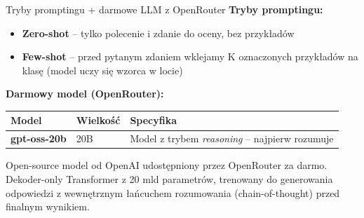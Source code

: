 \documentclass[10pt]{beamer}
\begin{document}
\begin{frame}{Tryby promptingu + darmowe LLM z OpenRouter}
  \scriptsize
  \textbf{Tryby promptingu:}
  \begin{itemize}
    \item \textbf{Zero-shot} -- tylko polecenie i zdanie do oceny, bez przykładów
    \item \textbf{Few-shot} -- przed pytanym zdaniem wklejamy K oznaczonych
          przykładów na klasę (model uczy się wzorca w locie)
  \end{itemize}

  \vspace{0.3em}
  \textbf{Darmowy model (OpenRouter):}
  \begin{center}
  \begin{tabular}{lll}
    \toprule
    Model & Wielkość & Specyfika \\
    \midrule
    \textbf{gpt-oss-20b} & 20B & Model z trybem \emph{reasoning} -- najpierw rozumuje \\
    \bottomrule
  \end{tabular}
  \end{center}
  Open-source model od OpenAI udostępniony przez OpenRouter za darmo.
  Dekoder-only Transformer z 20 mld parametrów, trenowany do generowania
  odpowiedzi z wewnętrznym łańcuchem rozumowania (chain-of-thought)
  przed finalnym wynikiem.
\end{frame}
\end{document}
